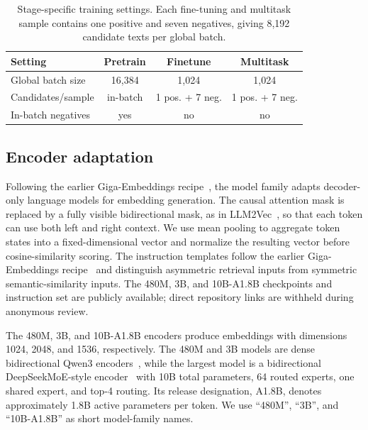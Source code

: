 \documentclass[11pt]{article}
\begin{document}
\begin{table}[!t]
  \caption{Stage-specific training settings. Each fine-tuning and multitask sample contains one positive and seven negatives, giving 8,192 candidate texts per global batch.}
  \label{tab:training}
  \centering
  \footnotesize
  \setlength{\tabcolsep}{1.5pt}
  \begin{tabular}{lccc}
    \toprule
    \textbf{Setting} & \textbf{Pretrain} & \textbf{Finetune} & \textbf{Multitask} \\
    \midrule
    Global batch size       & 16,384 & 1,024 & 1,024 \\
    Candidates/sample       & in-batch & 1 pos. + 7 neg. & 1 pos. + 7 neg. \\
    In-batch negatives      & yes & no & no \\
    \bottomrule
  \end{tabular}
\end{table}

\subsection{Encoder adaptation}

Following the earlier Giga-Embeddings recipe~\citep{kolodin2025gigaembeddings}, the model family adapts decoder-only language models for embedding generation.
The causal attention mask is replaced by a fully visible bidirectional mask, as in LLM2Vec~\citep{behnamghader2024llm2vec}, so that each token can use both left and right context.
We use mean pooling to aggregate token states into a fixed-dimensional vector and normalize the resulting vector before cosine-similarity scoring.
The instruction templates follow the earlier Giga-Embeddings recipe~\citep{kolodin2025gigaembeddings} and distinguish asymmetric retrieval inputs from symmetric semantic-similarity inputs.
The 480M, 3B, and 10B-A1.8B checkpoints and instruction set are publicly available; direct repository links are withheld during anonymous review.

The 480M, 3B, and 10B-A1.8B encoders produce embeddings with dimensions 1024, 2048, and 1536, respectively.
The 480M and 3B models are dense bidirectional Qwen3 encoders~\citep{zhang2025qwen3embedding}, while the largest model is a bidirectional DeepSeekMoE-style encoder~\citep{dai2024deepseekmoe} with 10B total parameters, 64 routed experts, one shared expert, and top-4 routing.
Its release designation, A1.8B, denotes approximately 1.8B active parameters per token.
We use ``480M'', ``3B'', and ``10B-A1.8B'' as short model-family names.
\end{document}
